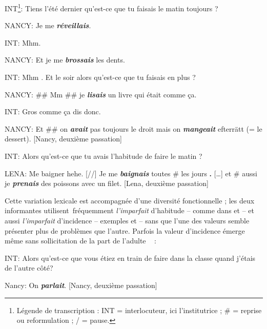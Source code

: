 \documentclass[french, output=paper]{langscibook}
\begin{document}
\begin{otherlanguage}{french}
\ea%
    \label{ex:kihlstedt:1}
    INT\footnote{Légende de transcription : INT = interlocuteur, ici l’institutrice ; \# = reprise ou reformulation ; / = pause.}: Tiens l’été dernier qu’est-ce que tu faisais le matin toujours ?



    NANCY:  Je me \textbf{\textit{réveillais}}.



    INT:  Mhm.



    NANCY:  Et je me \textbf{\textit{brossais}} les dents. 



    INT:  Mhm . Et le soir alors qu’est-ce que tu faisais en plus ?



    NANCY: \#\# Mm \#\# je \textbf{\textit{lisais}} un livre qui était comme ça.



    INT:  Gros comme ça dis donc.



    NANCY:  Et \#\# on \textbf{\textit{avait}} pas toujours le droit mais on \textbf{\textit{mangeait}} efterrätt (= le dessert). \hfill[Nancy, deuxième passation]
\z


\ea\label{ex:kihlstedt:2}  
INT:  Alors qu’est-ce que tu avais l'habitude de faire le matin ?



  LENA: Me baigner hehe. [//] Je me \textbf{\textit{baignais} }toutes \# les jours\textbf{ . }[…] et \# aussi je \textbf{\textit{prenais}} des poissons avec un filet. \hfill[Lena, deuxième passation]
\z


Cette variation lexicale est accompagnée d’une diversité fonctionnelle ; les deux informantes utilisent~fréquemment \textit{l’imparfait} d’habitude -- comme dans  et  -- et aussi \textit{l’imparfait} d’incidence -- exemples  et  -- sans que l’une des valeurs semble présenter plus de problèmes que l’autre. Parfois la valeur d’incidence émerge même sans sollicitation de la part de l’adulte ~  :



\ea%
    \label{ex:kihlstedt:3}
    INT:  Alors qu’est-ce que vous étiez en train de faire dans la classe quand j’étais de l’autre côté?



    Nancy:  On \textbf{\textit{parlait}}. \hfill[Nancy, deuxième passation]
\z



\end{otherlanguage}
\end{document}

